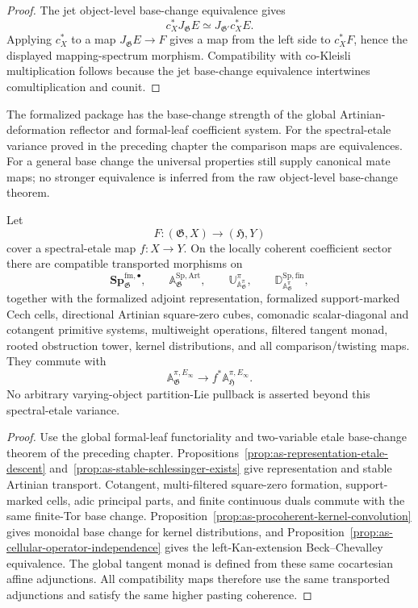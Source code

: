 \begin{proof}
The jet object-level base-change equivalence gives
\[
    c_X^*J_{\mathfrak G}E
    \simeq
    J_{\mathfrak G'}c_X^*E.
\]
Applying $c_X^*$ to a map $J_{\mathfrak G}E\to F$ gives a map from the left
side to $c_X^*F$, hence the displayed mapping-spectrum morphism.
Compatibility with co-Kleisli multiplication follows because the jet
base-change equivalence intertwines comultiplication and counit.
\end{proof}

\begin{remark}
The formalized package has the base-change strength of the global
Artinian-deformation reflector and formal-leaf coefficient system.  For the
spectral-etale variance proved in the preceding chapter the comparison maps
are equivalences.  For a general base change the universal properties still
supply canonical mate maps; no stronger equivalence is inferred from the raw
object-level base-change theorem.
\end{remark}

\begin{theorem}
\label{thm:as-etale-varying-object}
Let
\[
    F:(\mathfrak G,X)\longrightarrow(\mathfrak H,Y)
\]
cover a spectral-etale map $f:X\to Y$.  On the locally coherent coefficient
sector there are compatible transported morphisms on
\[
    \mathbf{Sp}_{\mathfrak G}^{\mathrm{fm},\bullet},
    \qquad
    \mathbb A_{\mathfrak G}^{\mathrm{Sp,Art}},
    \qquad
    \mathbb U^\pi_{\mathbb A^\pi_{\mathfrak G}},
    \qquad
    \mathbb D_{\mathbb A^\pi_{\mathfrak G}}^{\mathrm{Sp,fin}},
\]
together with the formalized adjoint representation, formalized support-marked
Cech cells, directional Artinian square-zero cubes, comonadic scalar-diagonal
and cotangent primitive systems, multiweight operations, filtered tangent
monad, rooted obstruction tower, kernel distributions, and all
comparison/twisting maps.  They commute with
\[
    \mathbb A_{\mathfrak G}^{\pi,E_\infty}
    \longrightarrow
    f^*\mathbb A_{\mathfrak H}^{\pi,E_\infty}.
\]
No arbitrary varying-object partition-Lie pullback is asserted beyond this
spectral-etale variance.
\end{theorem}

\begin{proof}
Use the global formal-leaf functoriality and two-variable etale base-change
theorem of the preceding chapter.  Propositions~\ref{prop:as-representation-etale-descent} and~\ref{prop:as-stable-schlessinger-exists} give representation and stable
Artinian transport.  Cotangent, multi-filtered square-zero formation,
support-marked cells, adic principal parts, and finite continuous duals
commute with the same finite-Tor base change.  Proposition~\ref{prop:as-procoherent-kernel-convolution} gives monoidal base change for
kernel distributions, and
Proposition~\ref{prop:as-cellular-operator-independence} gives the
left-Kan-extension Beck--Chevalley equivalence.  The global tangent monad is
defined from these same cocartesian affine adjunctions.  All compatibility
maps therefore use the same transported adjunctions and satisfy the same
higher pasting coherence.
\end{proof}

